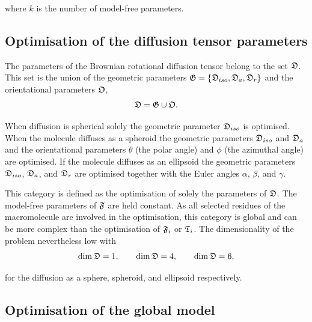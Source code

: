 \noindent where $k$ is the number of model-free parameters.




\subsection{Optimisation of the diffusion tensor parameters}

The parameters of the Brownian rotational diffusion tensor belong to the set $\mathfrak{D}$.  This set is the union of the geometric parameters $\mathfrak{G} = \{\mathfrak{D}_{iso}, \mathfrak{D}_a, \mathfrak{D}_r\}$ and the orientational parameters $\mathfrak{O}$,
\begin{equation}
    \mathfrak{D} = \mathfrak{G} \cup \mathfrak{O}.
\end{equation}

\noindent When diffusion is spherical solely the geometric parameter $\mathfrak{D}_{iso}$ is optimised.  When the molecule diffuses as a spheroid the geometric parameters $\mathfrak{D}_{iso}$ and $\mathfrak{D}_a$ and the orientational parameters $\theta$ (the polar angle) and $\phi$ (the azimuthal angle) are optimised.  If the molecule diffuses as an ellipsoid the geometric parameters $\mathfrak{D}_{iso}$, $\mathfrak{D}_a$, and $\mathfrak{D}_r$ are optimised together with the Euler angles $\alpha$, $\beta$, and $\gamma$.

This category is defined as the optimisation of solely the parameters of $\mathfrak{D}$.  The model-free parameters of $\mathfrak{F}$ are held constant.  As all selected residues of the macromolecule are involved in the optimisation, this category is global and can be more complex than the optimisation of $\mathfrak{F}_i$ or $\mathfrak{T}_i$.  The dimensionality of the problem nevertheless low with
\begin{equation}
    \dim \mathfrak{D} = 1, \qquad \dim \mathfrak{D} = 4, \qquad \dim \mathfrak{D} = 6,
\end{equation}

\noindent for the diffusion as a sphere, spheroid, and ellipsoid respectively.




\subsection{Optimisation of the global model}

